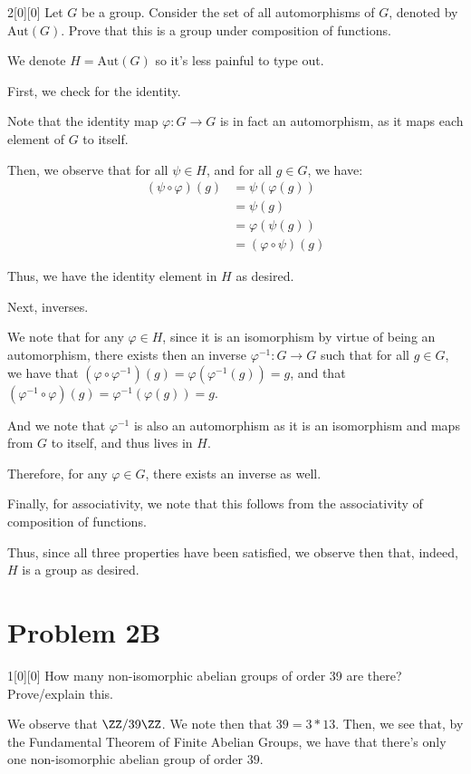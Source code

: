 \documentclass{article}
\begin{document}
\begin{hw}{2}[0][0]
	Let $G$ be a group. Consider the set of all automorphisms of $G$, denoted by $\mathrm{Aut}(G)$. Prove that this is a group under composition of functions.
\end{hw}
\begin{solution}
	We denote $H = \mathrm{Aut}(G)$ so it's less painful to type out.
	
	First, we check for the identity.
	\begin{innerproof}
		Note that the identity map $\varphi : G \rightarrow G$ is in fact an automorphism, as it maps each element of $G$ to itself.
		
		Then, we observe that for all $\psi \in H$, and for all $g \in G$, we have:
		\begin{align*}
			(\psi \circ \varphi)(g) &= \psi(\varphi(g)) \\
			&= \psi(g) \\
			&= \varphi(\psi(g)) \\
			&= (\varphi \circ \psi)(g)
		\end{align*}
		
		Thus, we have the identity element in $H$ as desired.
	\end{innerproof}

	Next, inverses.
	\begin{innerproof}
		We note that for any $\varphi \in H$, since it is an isomorphism by virtue of being an automorphism, there exists then an inverse $\varphi^{-1} : G \rightarrow G$ such that for all $g \in G$, we have that $(\varphi \circ \varphi^{-1})(g) = \varphi(\varphi^{-1}(g)) = g$, and that $(\varphi^{-1}\circ \varphi)(g) = \varphi^{-1}(\varphi(g)) = g$.
		
		And we note that $\varphi^{-1}$ is also an automorphism as it is an isomorphism and maps from $G$ to itself, and thus lives in $H$.
		
		Therefore, for any $\varphi \in G$, there exists an inverse as well.
	\end{innerproof}

	Finally, for associativity, we note that this follows from the associativity of composition of functions.
	
	Thus, since all three properties have been satisfied, we observe then that, indeed, $H$ is a group as desired.
\end{solution}

\addtocounter{section}{-1}
\section{Problem 2B}
\begin{hw}{1}[0][0]
	How many non-isomorphic abelian groups of order 39 are there? Prove/explain this.
\end{hw}
\begin{solution}
	We observe that $\ZZ/39\ZZ$. We note then that $39 = 3 * 13$. Then, we see that, by the Fundamental Theorem of Finite Abelian Groups, we have that there's only one non-isomorphic abelian group of order $39$.
\end{solution}
\end{document}
